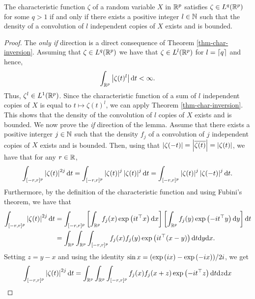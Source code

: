 \begin{lemma} \label{lem-char-integrable-convolution}
    The characteristic function $\zeta$ of a random variable $X$ in $\Rp$ satisfies $\zeta \in L^q(\Rp)$ for some $q > 1$ if and only if there exists a positive integer $l \in \N$ such that the density of a convolution of $l$ independent copies of $X$ exists and is bounded.
\end{lemma}
\begin{proof}
    The \textit{only if} direction is a direct consequence of Theorem \ref{thm-char-inversion}. Assuming that $\zeta \in L^q(\Rp)$ we have that $\zeta \in L^l(\Rp)$ for $l = \ceil{q}$ and hence,
    \begin{equation*}
        \intRp{t}{\abs{\zeta(t)^l}} < \infty.
    \end{equation*}
    Thus, $\zeta^l \in L^1(\Rp)$. Since the characteristic function of a sum of $l$ independent copies of $X$ is equal to $t \mapsto \zeta(t)^l$, we can apply Theorem \ref{thm-char-inversion}. This shows that the density of the convolution of $l$ copies of $X$ exists and is bounded.
    \newline
    We now prove the \textit{if} direction of the lemma. Assume that there exists a positive interger $j \in \N$ such that the density $f_j$ of a convolution of $j$ independent copies of $X$ exists and is bounded. Then, using that $\abs{\zeta(-t)} = \abs{\overline{\zeta(t)}} = \abs{\zeta(t)}$, we have that for any $r \in \R$,
    \begin{equation*}
        \int_{[-r, r]^p} \abs{\zeta(t)}^{2j} \d t
        = \int_{[-r, r]^p} \abs{\zeta(t)}^j\abs{\zeta(t)}^j \d t
        = \int_{[-r, r]^p} \abs{\zeta(t)}^j\abs{\zeta(-t)}^j \d t.
    \end{equation*}
    Furthermore, by the definition of the characteristic function and using Fubini's theorem, we have that
    \begin{align*}
        \int_{[-r, r]^p} \abs{\zeta(t)}^{2j} \d t
        &= \int_{[-r, r]^p} \left[\intRp{x}{f_j(x)\expf{it^\top x}}\right]\left[\intRp{y}{f_j(y)\expf{-it^\top y}}\right] \d t\\
        &= \intRp{x}{\intRp{y}{\int_{[-r, r]^p} f_j(x)f_j(y)\expf{it^\top (x - y)}\d t}}.
    \end{align*}
    Setting $z = y - x$ and using the identity $\sin x = (\expf{ix} - \expf{-ix}) / 2i$, we get
    \begin{align*}
        \int_{[-r, r]^p} \abs{\zeta(t)}^{2j} \d t
        &= \intRp{x}{\intRp{z}{\int_{[-r, r]^p} f_j(x)f_j(x + z)\expf{-it^\top z}\d t}}\\

\end{align*}
\end{proof}
